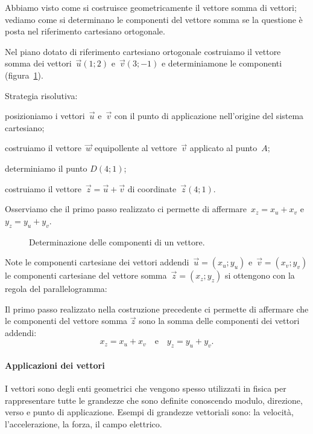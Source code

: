 Abbiamo visto come si costruisce geometricamente il vettore somma di vettori; vediamo come si determinano le componenti del vettore somma se la questione
è posta nel riferimento cartesiano ortogonale.

\begin{exrig}
\begin{esempio}
Nel piano dotato di riferimento cartesiano ortogonale costruiamo il vettore somma dei vettori~$\vec{u}(1;2)$ e~$\vec{v}(3;-1)$ e determiniamone
le componenti (figura~\ref{fig:F.10}).

Strategia risolutiva:
\begin{enumeratea}
\item posizioniamo i vettori~$\vec{u}$ e~$\vec{v}$ con il punto di applicazione nell'origine del sistema cartesiano;
\item costruiamo il vettore~$\vec{w}$ equipollente al vettore~$\vec{v}$ applicato al punto~$A$;
\item determiniamo il punto	$D(4;1)$;
\item costruiamo il vettore~$\vec{z}=\vec{u}+\vec{v}$ di coordinate~$\vec{z}(4;1)$.
\end{enumeratea}
Osserviamo che il primo passo realizzato ci permette di affermare~$x_z=x_u+x_v$ e~$y_z=y_u+y_v$.
\end{esempio}
\end{exrig}
\begin{figure}[t]
\centering

\caption{Determinazione delle componenti di un vettore.}\label{fig:F.10}
\end{figure}

\begin{procedura} Note le componenti cartesiane dei vettori addendi~$\vec{u}=(x_u;y_u)$ e~$\vec{v}=(x_v;y_v)$ le
 componenti cartesiane del vettore somma~$\vec{z}=(x_z;y_z)$ si ottengono con la regola del parallelogramma:

Il primo passo realizzato nella costruzione precedente ci permette di affermare che le componenti del vettore somma $\vec{z}$ sono la somma
delle componenti dei vettori addendi:\[x_z=x_u+x_v\quad\text{e}\quad y_z=y_u+y_v.\]
\end{procedura}

\ovalbox{\risolvi \ref{ese:B.3}}

\paragraph{Applicazioni dei vettori}
I vettori sono degli enti geometrici che vengono spesso utilizzati in fisica per rappresentare tutte le grandezze che sono definite conoscendo modulo, direzione,
verso e punto di applicazione. Esempi di grandezze vettoriali sono: la velocità, l'accelerazione, la forza, il campo elettrico.

